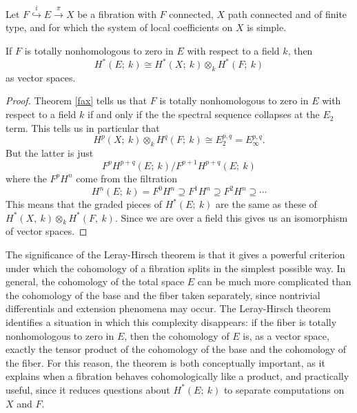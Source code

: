 \begin{corollary}
    Let $F\overset{i}{\hookrightarrow} E \overset{\pi}{\longrightarrow}X$ be a fibration with $F$ connected, $X$ path connected and of finite type, and for which the system of local coefficients on $X$ is simple.

    If $F$ is totally nonhomologous to zero in $E$ with respect to a field $k$, then
    \begin{equation*}
        H^*(E;\ k) \cong H^*(X;\ k) \otimes_k H^*(F;\ k)
    \end{equation*}
    as vector spaces.
\end{corollary}
\begin{proof}
Theorem \ref{fax} tells us that $F$ is totally nonhomologous to zero in $E$ with respect to a field $k$ if and only if the the spectral sequence collapses at the $E_2$ term.   This tells us in particular that
\begin{equation*}
 H^p(X;\ k)\otimes_k H^q(F;\ k)\cong E_2^{p,q}=  E^{p,q}_\infty.
\end{equation*}
But the latter is just 
\begin{equation*}
    F^pH^{p+q}(E;\ k) / F^{p+1}H^{p+q}(E;\ k)
\end{equation*}
where the $F^pH^n$ come from the filtration
\begin{equation*}
    H^n(E;\ k)=F^0H^n \supseteq F^1H^n \supseteq F^2H^n \supseteq \cdots
\end{equation*}
This means that the graded pieces of $H^*(E;\ k)$ are the same as these of $H^*(X, \ k) \otimes_k H^*(F,\ k)$. Since we are over a field this gives us an isomorphism of vector spaces. 

\end{proof}

The significance of the Leray-Hirsch theorem is that it gives a powerful criterion under which the cohomology of a fibration splits in the simplest possible way. In general, the cohomology of the total space $E$ can be much more complicated than the cohomology of the base and the fiber taken separately, since nontrivial differentials and extension phenomena may occur. The Leray-Hirsch theorem identifies a situation in which this complexity disappears: if the fiber is totally nonhomologous to zero in $E$, then the cohomology of $E$ is, as a vector space, exactly the tensor product of the cohomology of the base and the cohomology of the fiber. For this reason, the theorem is both conceptually important, as it explains when a fibration behaves cohomologically like a product, and practically useful, since it reduces questions about $H^*(E; \ k)$ to separate computations on $X$ and $F$.

